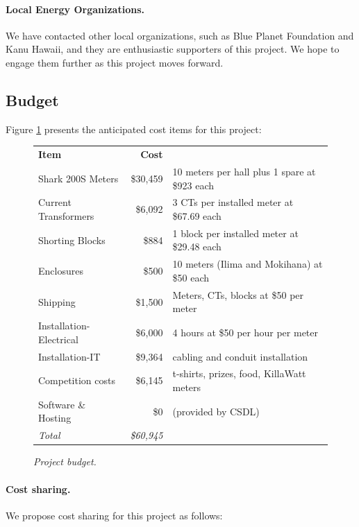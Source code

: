 \documentclass[11pt]{article}
\begin{document}
\paragraph{Local Energy Organizations.}  We have contacted other local
organizations, such as Blue Planet Foundation and Kanu Hawaii, and they are
enthusiastic supporters of this project.  We hope to engage them further as
this project moves forward.


\subsection{Budget}
\label{sec:budget}

Figure \ref{fig:budget} presents the anticipated cost items for this project:

\begin{figure}[!ht]
\small
\begin{tabular}{lrl} \hline
{\bf Item }  & {\bf Cost}  & \\ 
Shark 200S Meters      & \$30,459 & 10 meters per hall plus 1 spare at \$923 each \\
Current Transformers   & \$6,092  & 3 CTs per installed meter at \$67.69 each \\
Shorting Blocks        & \$884    & 1 block per installed meter at \$29.48 each \\
Enclosures             & \$500    & 10 meters (Ilima and Mokihana) at \$50 each \\
Shipping               & \$1,500  & Meters, CTs, blocks at \$50 per meter \\
Installation-Electrical & \$6,000 & 4 hours at \$50 per hour per meter \\
Installation-IT         & \$9,364 & cabling and conduit installation \\
Competition costs       & \$6,145 & t-shirts, prizes, food, KillaWatt meters \\
Software  \& Hosting    & \$0 & (provided by CSDL) \\ \hline
{\em Total}                 &  {\em \$60,945} & \\ \hline      
\end{tabular} 
\normalsize
\caption{{\em Project budget.}}
\label{fig:budget}
\end{figure}

\paragraph{Cost sharing.}  We propose cost sharing for this project as follows:
\end{document}
